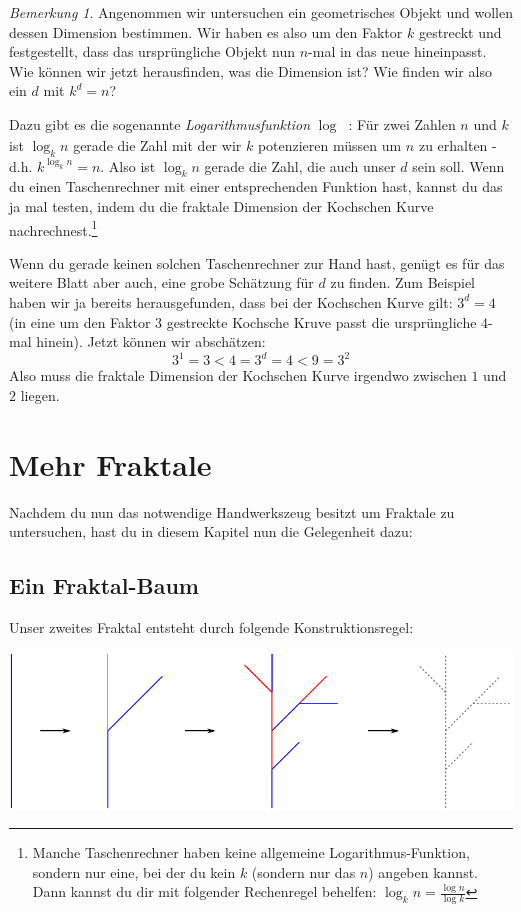 \documentclass[a4paper,ngerman,12pt]{scrartcl}
\theoremstyle{definition}
\theoremstyle{plain}
\theoremstyle{remark}
\newtheorem{bem}[defn]{Bemerkung}
\begin{document}
\begin{bem}
Angenommen wir untersuchen ein geometrisches Objekt und wollen dessen Dimension bestimmen. Wir haben es also um den Faktor $k$ gestreckt und festgestellt, dass das ursprüngliche Objekt nun $n$-mal in das neue hineinpasst. Wie können wir jetzt herausfinden, was die Dimension ist? Wie finden wir also ein $d$ mit $k^d = n$?

Dazu gibt es die sogenannte \emph{Logarithmusfunktion} $\log_{\boxed{}}\boxed{\phantom{k}}$: Für zwei Zahlen $n$ und $k$ ist $\log_k n$ gerade die Zahl mit der wir $k$ potenzieren müssen um $n$ zu erhalten - d.h. $k^{\log_k n} = n$. Also ist $\log_k n$ gerade die Zahl, die auch unser $d$ sein soll. Wenn du einen Taschenrechner mit einer entsprechenden Funktion hast, kannst du das ja mal testen, indem du die fraktale Dimension der Kochschen Kurve nachrechnest.\footnote{Manche Taschenrechner haben keine allgemeine Logarithmus-Funktion, sondern nur eine, bei der du kein $k$ (sondern nur das $n$) angeben kannst. Dann kannst du dir mit folgender Rechenregel behelfen: $\log_k n = \frac{\log n}{\log k}$}

Wenn du gerade keinen solchen Taschenrechner zur Hand hast, genügt es für das weitere Blatt aber auch, eine grobe Schätzung für $d$ zu finden. Zum Beispiel haben wir ja bereits herausgefunden, dass bei der Kochschen Kurve gilt: $3^d=4$ (in eine um den Faktor $3$ gestreckte Kochsche Kruve passt die ursprüngliche $4$-mal hinein). Jetzt können wir abschätzen:
\[3^1 = 3 < 4 = 3^d = 4 < 9 = 3^2\]
Also muss die fraktale Dimension der Kochschen Kurve irgendwo zwischen $1$ und $2$ liegen.
\end{bem}

\section{Mehr Fraktale}

Nachdem du nun das notwendige Handwerkszeug besitzt um Fraktale zu untersuchen, hast du in diesem Kapitel nun die Gelegenheit dazu:

\subsection{Ein Fraktal-Baum}

Unser zweites Fraktal entsteht durch folgende Konstruktionsregel:
\begin{center}
	\includegraphics[width=.7\textwidth]{Bilder/Baum-Konstruktion.pdf}
\end{center}
\end{document}
